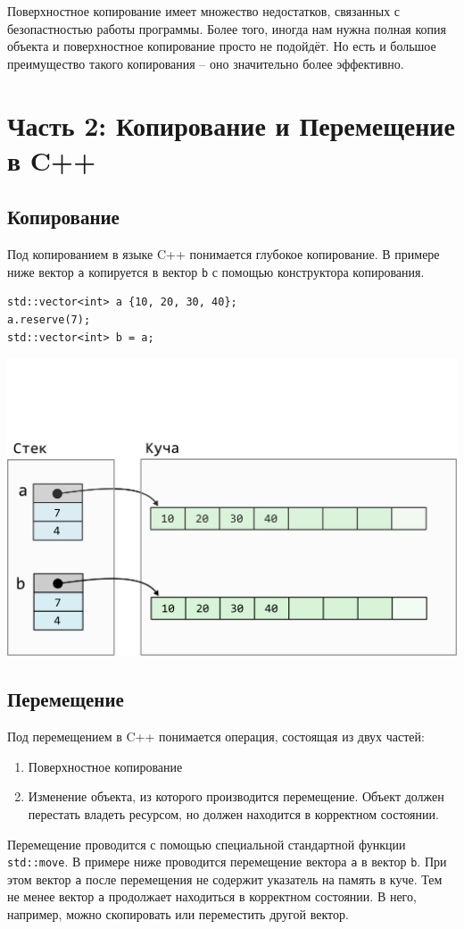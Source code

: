 \documentclass{article}
\begin{document}
Поверхностное копирование имеет множество недостатков, связанных с безопастностью работы программы. Более того, иногда нам нужна полная копия объекта и поверхностное копирование просто не подойдёт. Но есть и большое преимущество такого копирования -- оно значительно более эффективно.

\newpage
\section*{Часть 2: Копирование и Перемещение в C++}
\subsection*{Копирование}
Под копированием в языке C++ понимается глубокое копирование.  В примере ниже вектор \texttt{a} копируется в вектор \texttt{b} с помощью конструктора копирования.
\begin{lstlisting}
std::vector<int> a {10, 20, 30, 40};
a.reserve(7);
std::vector<int> b = a;
\end{lstlisting}
\begin{center}
\vspace*{-2.5cm}
\includegraphics[scale=0.7]{../images/vector_copy.png}
\end{center}

\subsection*{Перемещение}
Под перемещением в C++ понимается операция, состоящая из двух частей:
\begin{enumerate}
\item Поверхностное копирование
\item Изменение объекта, из которого производится перемещение. Объект должен перестать владеть ресурсом, но должен находится в корректном состоянии.
\end{enumerate}
Перемещение проводится с помощью специальной стандартной функции \texttt{std::move}. В примере ниже проводится перемещение вектора \texttt{a} в вектор \texttt{b}. При этом вектор \texttt{a} после перемещения не содержит указатель на память в куче. Тем не менее вектор \texttt{a} продолжает находиться в корректном состоянии. В него, например, можно скопировать или переместить другой вектор.
\end{document}
